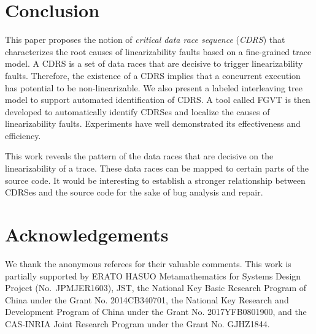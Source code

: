 \documentclass[runningheads]{llncs}
\begin{document}

\section{Conclusion}\label{sec:conclusion}
This paper proposes the notion of \textit{critical data race sequence} (\textit{CDRS}) that characterizes the root causes of linearizability faults based on a fine-grained trace model. A CDRS is a set of data races that are decisive to trigger linearizability faults. Therefore, the existence of a CDRS implies that a concurrent execution has potential to be non-linearizable. We also present a labeled interleaving tree model to support automated identification of CDRS. A tool called FGVT is then developed to automatically identify CDRSes and localize the causes of linearizability faults. Experiments have well demonstrated its effectiveness and efficiency.

This work reveals the pattern of the data races that are decisive on the linearizability of a trace. These data races can be mapped to certain parts of the source code. It would be interesting to establish a stronger relationship between CDRSes and the source code for the sake of bug analysis and repair.

\section{Acknowledgements}\label{sec:acknowledgement}

We thank the anonymous referees for their valuable comments. This work is partially supported by ERATO HASUO Metamathematics for Systems Design Project (No.~{JPMJER1603}), JST, the National Key Basic Research Program of China under the Grant No. 2014CB340701, the National Key Research and Development Program of China under the Grant No. 2017YFB0801900, and the CAS-INRIA Joint Research Program under the Grant No. GJHZ1844.

%
%
 
 
%
\end{document}
